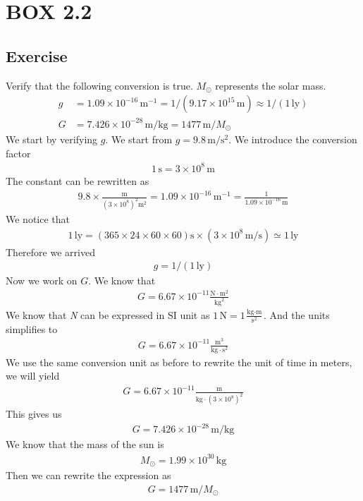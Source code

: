\documentclass[12pt]{memoir}
\newcommand{\paren}[1]{\left( #1 \right)}
\begin{document}
\section{BOX 2.2}
\subsection{Exercise}
Verify that the following conversion is true. $M_\odot$ represents the solar mass.
\begin{align*}
g &= 1.09 \times 10^{-16} \, \text{m}^{-1} = 1 / (9.17 \times 10^{15} \, \text{m}) \approx 1 / (1 \, \text{ly})\\
G &= 7.426 \times 10^{-28} \, \text{m/kg} = 1477 \, \text{m} / M_\odot
\end{align*}
We start by verifying $g$. We start from $g = 9.8 \,\text{m/s$^2$}$. We introduce the conversion factor
\begin{align}
1\, \text{s} = 3\times 10^{8} \,\text{m}
\end{align}
The constant can be rewritten as
\begin{align}
9.8 \times \frac{\text{m}}{\paren{3\times 10^{8}}^2\text{m}^2} =  1.09 \times 10^{-16} \, \text{m}^{-1} = \frac{1}{1.09 \times 10^{-16}\,\text{m}}
\end{align}
We notice that
\begin{align}
1\,\text{ly} = \paren{365\times 24\times 60\times 60}\text{s} \times \paren{3\times 10^{8} \,\text{m/s}} \simeq 1\,\text{ly}
\end{align}
Therefore we arrived 
\begin{align}
g = 1 / (1 \, \text{ly})
\end{align}
Now we work on $G$. We know that 
\begin{align}
G = 6.67 \times 10^{-11} \frac{\text{N}\cdot\text{m}^2}{\text{kg}^2}
\end{align}
We know that \textit{N} can be expressed in SI unit as $1\,$N$= 1\frac{\text{kg}\cdot\text{m}}{\text{s}^2}$. And the units simplifies to
\begin{align}
G = 6.67 \times 10^{-11} \frac{\text{m}^3}{\text{kg}\cdot \text{s}^2}
\end{align}
We use the same conversion unit as before to rewrite the unit of time in meters, we will yield
\begin{align}
G = 6.67 \times 10^{-11} \frac{\text{m}}{\text{kg}\cdot \paren{3\times 10^{8}}^2}
\end{align}
This gives us
\begin{align}
G = 7.426 \times 10^{-28}\, \text{m/kg}
\end{align}
We know that the mass of the sun is
\begin{align}
M_\odot = 1.99 \times 10^{30}\,\text{kg}
\end{align}
Then we can rewrite the expression as
\begin{align}
G = 1477 \, \text{m} / M_\odot
\end{align}
\end{document}
